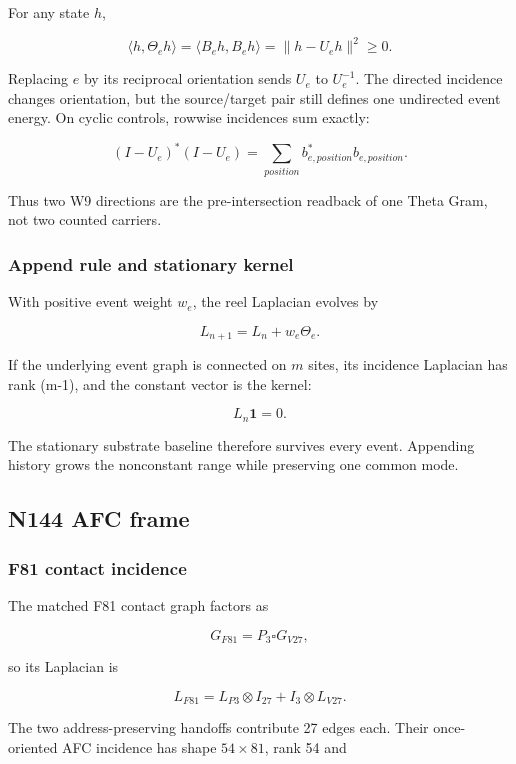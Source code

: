 For any state \(h\),

\[
\langle h,\Theta_eh\rangle
=\langle B_eh,B_eh\rangle
=\|h-U_eh\|^2\ge0.
\]

Replacing \(e\) by its reciprocal orientation sends \(U_e\) to
\(U_e^{-1}\). The directed incidence changes orientation, but the
source/target pair still defines one undirected event energy. On cyclic
controls, rowwise incidences sum exactly:

\[
(I-U_e)^*(I-U_e)
=\sum_{position}b_{e,position}^*b_{e,position}.
\]

Thus two W9 directions are the pre-intersection readback of one Theta
Gram, not two counted carriers.

\subsubsection{Append rule and stationary
kernel}\label{viii-ch06-append-rule-and-stationary-kernel}

With positive event weight \(w_e\), the reel Laplacian evolves by

\[
L_{n+1}=L_n+w_e\Theta_e.
\]

If the underlying event graph is connected on \(m\) sites, its incidence
Laplacian has rank (m-1), and the constant vector is the kernel:

\[
L_n\mathbf1=0.
\]

The stationary substrate baseline therefore survives every event.
Appending history grows the nonconstant range while preserving one
common mode.

\subsection{N144 AFC frame}\label{viii-ch06-n144-afc-frame}

\subsubsection{F81 contact incidence}\label{viii-ch06-f81-contact-incidence}

The matched F81 contact graph factors as

\[
G_{F81}=P_3\square G_{V27},
\]

so its Laplacian is

\[
L_{F81}=L_{P3}\otimes I_{27}+I_3\otimes L_{V27}.
\]

The two address-preserving handoffs contribute 27 edges each. Their
once- oriented AFC incidence has shape \(54\times81\), rank 54 and

